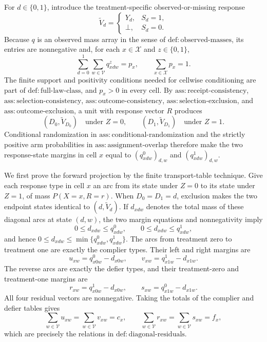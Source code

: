 For \(d\in\{0,1\}\), introduce the treatment-specific observed-or-missing response
\[
 \widetilde V_d=
 \begin{cases}
 Y_d,&S_d=1,\\
 \bot,&S_d=0.
 \end{cases}
\]
Because \(q\) is an observed mass array in the sense of \(\mathrm{def:observed\text{-}masses}\), its entries are nonnegative and, for each \(x\in\mathcal X\) and \(z\in\{0,1\}\),
\[
 \sum_{d=0}^1\sum_{w\in\mathcal V}q^z_{xdw}=p_x,
 \qquad
 \sum_{x\in\mathcal X}p_x=1.
\]
The finite support and positivity conditions needed for cellwise conditioning are part of \(\mathrm{def:full\text{-}law\text{-}class}\), and \(p_x>0\) in every cell.  By \(\mathrm{ass:receipt\text{-}consistency}\), \(\mathrm{ass:selection\text{-}consistency}\), \(\mathrm{ass:outcome\text{-}consistency}\), \(\mathrm{ass:selection\text{-}exclusion}\), and \(\mathrm{ass:outcome\text{-}exclusion}\), a unit with response vector \(R\) produces
\[
 (D_0,\widetilde V_{D_0})\quad\text{under }Z=0,
 \qquad
 (D_1,\widetilde V_{D_1})\quad\text{under }Z=1.
\]
Conditional randomization in \(\mathrm{ass:conditional\text{-}randomization}\) and the strictly positive arm probabilities in \(\mathrm{ass:assignment\text{-}overlap}\) therefore make the two response-state margins in cell \(x\) equal to \((q^0_{xdw})_{d,w}\) and \((q^1_{xdw})_{d,w}\).

We first prove the forward projection by the finite transport-table technique.  Give each response type in cell \(x\) an arc from its state under \(Z=0\) to its state under \(Z=1\), of mass \(P(X=x,R=r)\).  When \(D_0=D_1=d\), exclusion makes the two endpoint states identical to \((d,\widetilde V_d)\).  If \(d_{xdw}\) denotes the total mass of these diagonal arcs at state \((d,w)\), the two margin equations and nonnegativity imply
\[
 0\leq d_{xdw}\leq q^0_{xdw},
 \qquad
 0\leq d_{xdw}\leq q^1_{xdw},
\]
and hence \(0\leq d_{xdw}\leq\min\{q^0_{xdw},q^1_{xdw}\}\).  The arcs from treatment zero to treatment one are exactly the complier types.  Their left and right margins are
\[
 u_{xw}=q^0_{x0w}-d_{x0w},
 \qquad
 v_{xw}=q^1_{x1w}-d_{x1w}.
\]
The reverse arcs are exactly the defier types, and their treatment-zero and treatment-one margins are
\[
 r_{xw}=q^1_{x0w}-d_{x0w},
 \qquad
 s_{xw}=q^0_{x1w}-d_{x1w}.
\]
All four residual vectors are nonnegative.  Taking the totals of the complier and defier tables gives
\[
 \sum_{w\in\mathcal V}u_{xw}
 =\sum_{w\in\mathcal V}v_{xw}=c_x,
 \qquad
 \sum_{w\in\mathcal V}r_{xw}
 =\sum_{w\in\mathcal V}s_{xw}=f_x,
\]
which are precisely the relations in \(\mathrm{def:diagonal\text{-}residuals}\).

